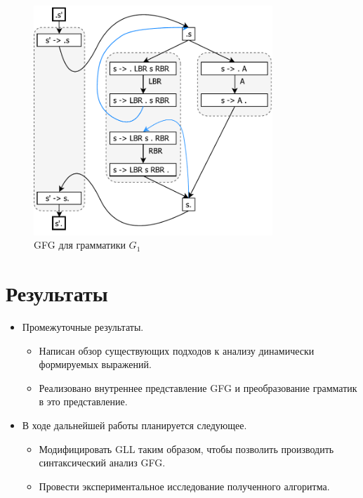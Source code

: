 \documentclass[14pt]{matmex-diploma-custom}
\begin{document}
\begin{figure}[h]
    \centering
    \includegraphics[width=9cm]{pictures/GFG.pdf}
    \caption{GFG для грамматики $G_1$}
    \label{gfg_ex}
\end{figure}


\section{Результаты}

\begin{itemize}
\item Промежуточные результаты.
\begin{itemize}
    \item Написан обзор существующих подходов к анализу динамически формируемых выражений.   
    \item Реализовано внутреннее представление GFG и преобразование грамматик в это представление.
\end{itemize}
\end{itemize}

\begin{itemize}
    \item В ходе дальнейшей работы планируется следующее.
    \begin{itemize}
        \item Модифицировать GLL таким образом, чтобы позволить производить синтаксический анализ GFG.
        \item Провести экспериментальное исследование полученного алгоритма. 
    \end{itemize}
\end{itemize}


\setmonofont[Mapping=tex-text]{CMU Typewriter Text}


\end{document}
